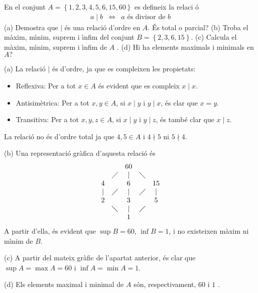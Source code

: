 \begin{exer}
En el conjunt $A=\left\{ 1,2,3,4,5,6,15,60\right\} $ es defineix la relaci%
\'{o}%
\begin{equation*}
\begin{array}{ccc}
a\mid b & \Longleftrightarrow & a\text{ \'{e}s divisor de }b%
\end{array}%
\end{equation*}%
(a) Demostra que $\mid $ \'{e}s una relaci\'{o} d'ordre en $A$. \'{E}s total
o parcial? (b) Troba el m\`{a}xim, m\'{\i}nim, suprem i \'{\i}nfim del
conjunt $B=\left\{ 2,3,6,15\right\} $. (c) Calcula el m\`{a}xim, m\'{\i}nim,
suprem i \'{\i}nfim de $A$ . (d) Hi ha elements maximals i minimals en $A?$
\end{exer}

\begin{solucio}
(a) La relaci\'{o} $\mid $ \'{e}s d'ordre, ja que es compleixen les
propietats:

\begin{itemize}
\item Reflexiva: Per a tot $x\in A$ \'{e}s evident que es compleix $x\mid x$.

\item Antisim\`{e}trica: Per a tot $x,y\in A$, si $x\mid y$ i $y\mid x$,
\'{e}s clar que $x=y$.

\item Transitiva: Per a tot $x,y,z\in A$, si $x\mid y$ i $y\mid z$, \'{e}s
tamb\'{e} clar que $x\mid z$.
\end{itemize}

La relaci\'{o} no \'{e}s d'ordre total ja que $4,5\in A$ i $4\nmid 5$ ni $%
5\nmid 4$.

(b) Una representaci\'{o} gr\`{a}fica d'aquesta relaci\'{o} \'{e}s%
\begin{equation*}
\begin{array}{ccccc}
&  & 60 &  &  \\
& \diagup & | & \diagdown &  \\
4 &  & 6 &  & 15 \\
| & \diagup & | & \diagup & | \\
2 &  & 3 &  & 5 \\
& \diagdown & | & \diagup &  \\
&  & 1 &  &
\end{array}%
\end{equation*}%
A partir d'ella, \'{e}s evident que $\sup B=60$, $\inf B=1$, i no existeixen
m\`{a}xim ni m\'{\i}nim de $B$.

(c) A partir del mateix gr\`{a}fic de l'apartat anterior, \'{e}s clar que $%
\sup A=\max A=60$ i $\inf A=\min A=1$.

(d) Els elements maximal i minimal de $A$ s\'{o}n, respectivament, $60$ i $1$%
.
\end{solucio}

